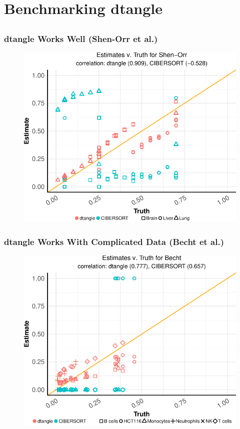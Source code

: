 \documentclass[usenames,dvipsnames,15pt]{beamer}
\begin{document}
\setcounter{subsection}{0}
\section{Benchmarking dtangle}
\subsection{}

\begin{frame}
  \frametitle{dtangle Works Well (Shen-Orr et al.)}
  \begin{figure}
   \hspace*{-1cm}
  \includegraphics[scale=.75]{pictures/Shen-Orr_scatter.pdf}
  \end{figure}
\end{frame}


\begin{frame}
  \frametitle{dtangle Works With Complicated Data (Becht et al.)}
  \begin{figure}
   \hspace*{-1cm}
  \includegraphics[scale=.75]{pictures/Becht_scatter.pdf}
  \end{figure}
\end{frame}
\end{document}
